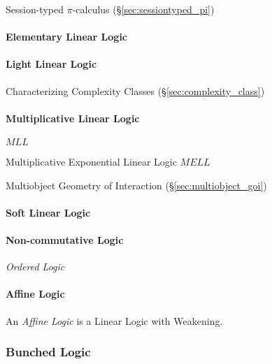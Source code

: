 Session-typed $\pi$-calculus (\S\ref{sec:sessiontyped_pi})



\paragraph{Elementary Linear Logic}\label{sec:elementary_linear_logic}\hfill

\paragraph{Light Linear Logic}\label{sec:light_linear_logic}\hfill

Characterizing Complexity Classes (\S\ref{sec:complexity_class})



\paragraph{Multiplicative Linear Logic}\hfill
\label{sec:multiplicative_linear_logic}

\cite{haghverdi-scott05}

$MLL$

Multiplicative Exponential Linear Logic $MELL$

Multiobject Geometry of Interaction (\S\ref{sec:multiobject_goi})



\paragraph{Soft Linear Logic}\label{sec:soft_linear_logic}\hfill

\paragraph{Non-commutative Logic}\label{sec:noncommutative_logic}\hfill

\emph{Ordered Logic}



\paragraph{Affine Logic}\label{sec:affine_logic}\hfill

An \emph{Affine Logic} is a Linear Logic with Weakening.



\subsubsection{Bunched Logic}\label{sec:bunched_logic}

